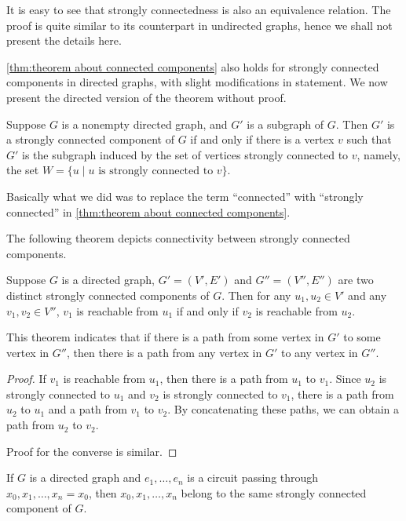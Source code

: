 It is easy to see that strongly connectedness is also an equivalence relation. The proof is quite similar to its counterpart in undirected graphs, hence we shall not present the details here. 

\cref{thm:theorem about connected components} also holds for strongly connected components in directed graphs, with slight modifications in statement. We now present the directed version of the theorem without proof.

\begin{theorem}
    Suppose $G$ is a nonempty directed graph, and $G'$ is a subgraph of $G$. Then $G'$ is a strongly connected component of $G$ if and only if there is a vertex $v$ such that $G'$ is the subgraph induced by the set of vertices strongly connected to $v$, namely, the set $W=\{u\mid u\text{ is strongly connected to }v\}$.
\end{theorem}

Basically what we did was to replace the term ``connected'' with ``strongly connected'' in \cref{thm:theorem about connected components}.

The following theorem depicts connectivity between strongly connected components. 

\begin{theorem}
    Suppose $G$ is a directed graph, $G'=(V',E')$ and $G''=(V'',E'')$ are two distinct strongly connected components of $G$. Then for any $u_1,u_2\in V'$ and any $v_1,v_2\in V''$, $v_1$ is reachable from $u_1$ if and only if $v_2$ is reachable from $u_2$.
\end{theorem}

This theorem indicates that if there is a path from some vertex in $G'$ to some vertex in $G''$, then there is a path from any vertex in $G'$ to any vertex in $G''$. 

\begin{proof}
    If $v_1$ is reachable from $u_1$, then there is a path from $u_1$ to $v_1$. Since $u_2$ is strongly connected to $u_1$ and $v_2$ is strongly connected to $v_1$, there is a path from $u_2$ to $u_1$ and a path from $v_1$ to $v_2$. By concatenating these paths, we can obtain a path from $u_2$ to $v_2$. 
     
    Proof for the converse is similar. 
\end{proof}

\begin{theorem}
    If $G$ is a directed graph and $e_1,\dots,e_n$ is a circuit passing through $x_0,x_1,\dots,x_n=x_0$, then $x_0,x_1,\dots,x_n$ belong to the same strongly connected component of $G$.
\end{theorem}


